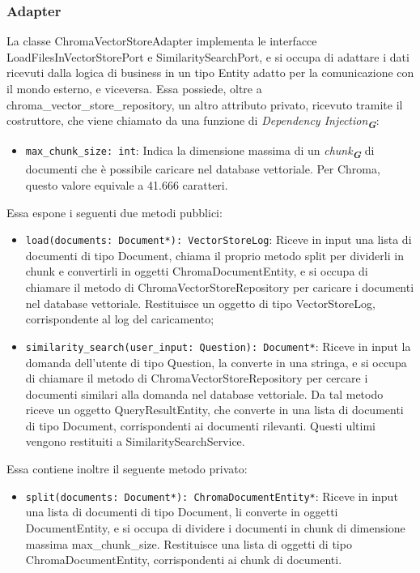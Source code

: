 \newpage


\subsubsection{Adapter}
\label{sec:adapter}

\label{sec:chroma_vector_store_adapter}
La classe ChromaVectorStoreAdapter implementa le interfacce LoadFilesInVectorStorePort e SimilaritySearchPort, e si occupa di adattare i dati ricevuti dalla logica di business in un tipo Entity adatto per la comunicazione con il mondo esterno, e viceversa. 
Essa possiede, oltre a chroma\_vector\_store\_repository, un altro attributo privato, ricevuto tramite il costruttore, che viene chiamato da una funzione di \emph{Dependency Injection}\textsubscript{\textbf{\textit{G}}}:
\begin{itemize}
    \item \texttt{max\_chunk\_size: int}: Indica la dimensione massima di un \emph{chunk}\textsubscript{\textbf{\textit{G}}} di documenti che è possibile caricare nel database vettoriale. Per Chroma, questo valore equivale a 41.666 caratteri.
\end{itemize}
Essa espone i seguenti due metodi pubblici:
\begin{itemize}
    \item \texttt{load(documents: Document*): VectorStoreLog}: Riceve in input una lista di documenti di tipo Document, chiama il proprio metodo split per dividerli in chunk e convertirli in oggetti ChromaDocumentEntity, e si occupa di chiamare il metodo di ChromaVectorStoreRepository per caricare i documenti nel database vettoriale. Restituisce un oggetto di tipo VectorStoreLog, corrispondente al log del caricamento;
    \item \texttt{similarity\_search(user\_input: Question): Document*}: Riceve in input la domanda dell'utente di tipo Question, la converte in una stringa, e si occupa di chiamare il metodo di ChromaVectorStoreRepository per cercare i documenti similari alla domanda nel database vettoriale. Da tal metodo riceve un oggetto QueryResultEntity, che converte in una lista di documenti di tipo Document, corrispondenti ai documenti rilevanti. Questi ultimi vengono restituiti a SimilaritySearchService.
\end{itemize}
Essa contiene inoltre il seguente metodo privato:
\begin{itemize}
    \item \texttt{split(documents: Document*): ChromaDocumentEntity*}: Riceve in input una lista di documenti di tipo Document, li converte in oggetti DocumentEntity, e si occupa di dividere i documenti in chunk di dimensione massima max\_chunk\_size. Restituisce una lista di oggetti di tipo ChromaDocumentEntity, corrispondenti ai chunk di documenti.
\end{itemize}

